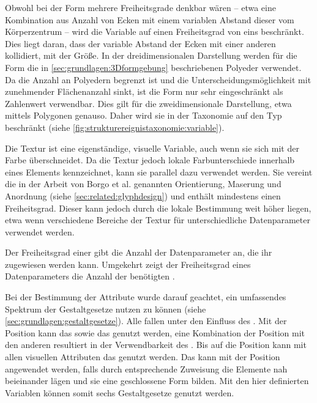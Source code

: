 Obwohl bei der Form mehrere Freiheitsgrade denkbar wären -- etwa eine Kombination aus Anzahl von Ecken mit einem variablen Abstand dieser vom Körperzentrum -- wird die Variable auf einen Freiheitsgrad von eins beschränkt. Dies liegt daran, dass der variable Abstand der Ecken mit einer anderen  kollidiert, mit der Größe. In der dreidimensionalen Darstellung werden für die Form die in \autoref{sec:grundlagen:3Dformgebung} beschriebenen Polyeder verwendet. Da die Anzahl an Polyedern begrenzt ist und die Unterscheidungsmöglichkeit mit zunehmender Flächenanzahl sinkt, ist die Form nur sehr eingeschränkt als Zahlenwert verwendbar. Dies gilt für die zweidimensionale Darstellung, etwa mittels Polygonen genauso. Daher wird sie in der Taxonomie auf den Typ  beschränkt (siehe \autoref{fig:strukturereignistaxonomie:variable}).

Die Textur ist eine eigenständige, visuelle Variable, auch wenn sie sich mit der Farbe
überschneidet. Da die Textur jedoch lokale Farbunterschiede innerhalb eines Elements kennzeichnet, kann sie parallel dazu verwendet werden. Sie vereint die in der Arbeit von Borgo et al. genannten  Orientierung, Maserung und Anordnung (siehe \autoref{sec:related:glyphdesign}) und enthält mindestens einen Freiheitsgrad. Dieser kann jedoch durch die lokale Bestimmung weit höher liegen, etwa wenn verschiedene Bereiche der Textur für unterschiedliche Datenparameter verwendet werden.

Der Freiheitsgrad einer  gibt die Anzahl der Datenparameter an, die ihr zugewiesen werden kann. Umgekehrt zeigt der Freiheitsgrad eines Datenparameters die Anzahl der benötigten .

Bei der Bestimmung der Attribute wurde darauf geachtet, ein umfassendes Spektrum der Gestaltgesetze nutzen zu können (siehe \autoref{sec:grundlagen:gestaltgesetze}). Alle  fallen unter den Einfluss des . Mit der Position kann das  sowie das  genutzt werden, eine Kombination der Position mit den anderen  resultiert in der Verwendbarkeit des . Bis auf die Position kann mit allen visuellen Attributen das  genutzt werden. Das  kann mit der Position angewendet werden, falls durch entsprechende Zuweisung die Elemente nah beieinander lägen und sie eine geschlossene Form bilden. Mit den hier definierten Variablen können somit sechs Gestaltgesetze genutzt werden.

